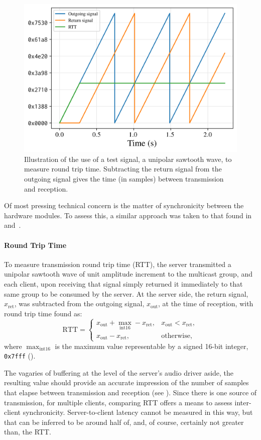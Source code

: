 \begin{figure}[ht]
    \centering
    \includegraphics[width=.5\textwidth]{figures/test-signal}
    \caption{
        Illustration of the use of a test signal, a unipolar sawtooth wave,
        to measure round trip time.
        Subtracting the return signal from the outgoing signal gives the time
        (in samples) between transmission and reception.
    }
    \label{fig:test-signal}
\end{figure}
\noindent
Of most pressing technical concern is the matter of synchronicity between the
hardware modules.
To assess this, a similar approach was taken to that found
in~\citep{rushton_microcontroller-based_2023}
and~\citep{gabrielli_networked_2012}.

\paragraph{Round Trip Time} To measure transmission round trip time (RTT), the
server transmitted a unipolar sawtooth wave of unit amplitude increment to the
multicast group, and each client, upon receiving that signal simply returned it
immediately to that same group to be consumed by the server.
At the server side, the return signal, $x_{\text{ret}}$, was subtracted from the
outgoing signal, $x_{\text{out}}$, at the time of reception, with round trip
time found as:
\begin{equation}
    \label{eq:rtt}
    \text{RTT} = \begin{cases}
                     x_{\text{out}} + \max_{\text{int16}} - x_{\text{ret}}, &x_{\text{out}} < x_{\text{ret}}, \\
                     x_{\text{out}} - x_{\text{ret}}, &\text{otherwise},
    \end{cases}
\end{equation}
where $\max_{\text{int16}}$ is the maximum value representable by a
signed 16-bit integer, \texttt{0x7fff} ().

The vagaries of buffering at the level of the server's audio driver aside, the
resulting value should provide an accurate impression of the number of samples
that elapse between transmission and reception (see ).
Since there is one source of transmission, for multiple clients, comparing RTT
offers a means to assess inter-client synchronicity.
Server-to-client latency cannot be measured in this way, but that can be
inferred to be around half of, and, of course, certainly not greater than, the
RTT.\

